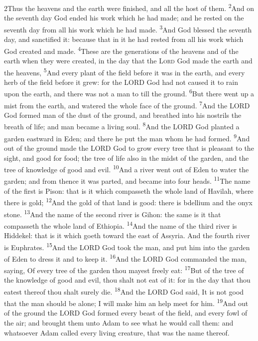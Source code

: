 \documentclass[10pt,oneside,a4paper]{memoir}
\renewcommand{\verse}[1]{\textsuperscript{#1}}
\begin{document}
\begin{paracol}{2}
\switchcolumn
\lettrine{2}Thus the heavens and the earth were finished, and all the host of them.  
\verse{2}And on the seventh day God ended his work which he had made; and he rested on the seventh day from all his work which he had made.  
\verse{3}And God blessed the seventh day, and sanctified it: because that in it he had rested from all his work which God created and made.  
\verse{4}These are the generations of the heavens and of the earth when they were created, in the day that the \textsc{Lord} God made the earth and the heavens, 
\verse{5}And every plant of the field before it was in the earth, and every herb of the field before it grew: for the LORD God had not caused it to rain upon the earth, and there was not a man to till the ground.  
\verse{6}But there went up a mist from the earth, and watered the whole face of the ground.  
\verse{7}And the L{\footnotesize ORD} God formed man of the dust of the ground, and breathed into his nostrils the breath of life; and man became a living soul.  
\verse{8}And the L{\small ORD} God planted a garden eastward in Eden; and there he put the man whom he had formed.  
\verse{9}And out of the ground made the LORD God to grow every tree that is pleasant to the sight, and good for food; the tree of life also in the midst of the garden, and the tree of knowledge of good and evil.  
\verse{10}And a river went out of Eden to water the garden; and from thence it was parted, and became into four heads.  
\verse{11}The name of the first is Pison: that is it which compasseth the whole land of Havilah, where there is gold; 
\verse{12}And the gold of that land is good: there is bdellium and the onyx stone.  
\verse{13}And the name of the second river is Gihon: the same is it that compasseth the whole land of Ethiopia.  
\verse{14}And the name of the third river is Hiddekel: that is it which goeth toward the east of Assyria. And the fourth river is Euphrates.  
\verse{15}And the LORD God took the man, and put him into the garden of Eden to dress it and to keep it.  
\verse{16}And the LORD God commanded the man, saying, Of every tree of the garden thou mayest freely eat: 
\verse{17}But of the tree of the knowledge of good and evil, thou shalt not eat of it: for in the day that thou eatest thereof thou shalt surely die.  
\verse{18}And the LORD God said, It is not good that the man should be alone; I will make him an help meet for him.  
\verse{19}And out of the ground the LORD God formed every beast of the field, and every fowl of the air; and brought them unto Adam to see what he would call them: and whatsoever Adam called every living creature, that was the name thereof.  

\end{paracol}
\end{document}
